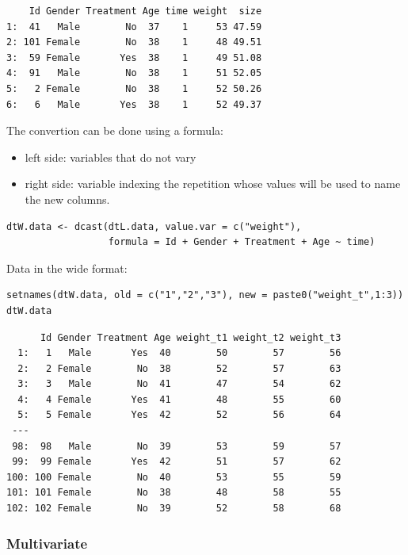 \documentclass{article}
\begin{document}
\begin{verbatim}
    Id Gender Treatment Age time weight  size
1:  41   Male        No  37    1     53 47.59
2: 101 Female        No  38    1     48 49.51
3:  59 Female       Yes  38    1     49 51.08
4:  91   Male        No  38    1     51 52.05
5:   2 Female        No  38    1     52 50.26
6:   6   Male       Yes  38    1     52 49.37
\end{verbatim}

The convertion can be done using a formula:
\begin{itemize}
\item left side: variables that do not vary
\item right side: variable indexing the repetition whose values will be
used to name the new columns.
\end{itemize}
\lstset{language=r,label= ,caption= ,captionpos=b,numbers=none}
\begin{lstlisting}
dtW.data <- dcast(dtL.data, value.var = c("weight"),
				  formula = Id + Gender + Treatment + Age ~ time)
\end{lstlisting}

Data in the wide format:
\lstset{language=r,label= ,caption= ,captionpos=b,numbers=none}
\begin{lstlisting}
setnames(dtW.data, old = c("1","2","3"), new = paste0("weight_t",1:3))
dtW.data
\end{lstlisting}

\begin{verbatim}
      Id Gender Treatment Age weight_t1 weight_t2 weight_t3
  1:   1   Male       Yes  40        50        57        56
  2:   2 Female        No  38        52        57        63
  3:   3   Male        No  41        47        54        62
  4:   4 Female       Yes  41        48        55        60
  5:   5 Female       Yes  42        52        56        64
 ---                                                       
 98:  98   Male        No  39        53        59        57
 99:  99 Female       Yes  42        51        57        62
100: 100 Female        No  40        53        55        59
101: 101 Female        No  38        48        58        55
102: 102 Female        No  39        52        58        68
\end{verbatim}

\clearpage

\subsubsection{Multivariate}
\label{sec:org60ceacc}
\end{document}
